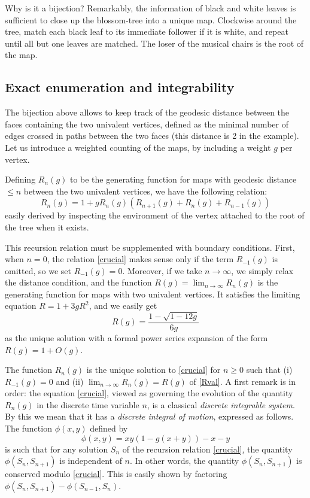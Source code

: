 \documentclass[12pt]{amsart}
\numberwithin{equation}{section}
\begin{document}
Why is it a bijection? Remarkably, the information of black and white leaves is sufficient to close up the blossom-tree 
into a unique map. Clockwise around the tree, match each black leaf to its immediate follower if it is white, and repeat until
all but one leaves are matched. The loser of the musical chairs is the root of the map.

\subsection{Exact enumeration and integrability}

The bijection above allows to keep track of the geodesic distance between the faces containing the two univalent vertices,
defined as the minimal number of edges crossed in paths between the two faces
(this distance is 2 in the example). Let us introduce a weighted counting of the maps, by including a weight $g$ per vertex.

Defining $R_n(g)$ to be the generating function for maps with geodesic distance $\leq n$ 
between the two univalent vertices, we have the following relation:
\begin{equation}\label{crucial}
R_n(g)= 1+ gR_n(g)\left( R_{n+1}(g)+R_n(g)+R_{n-1}(g)\right) 
\end{equation}
easily derived by inspecting the environment of the vertex attached to the root of the tree when it exists.

This recursion relation must be supplemented with boundary conditions. First, when $n=0$, the relation \eqref{crucial}
makes sense only if the term $R_{-1}(g)$ is omitted, so we set $R_{-1}(g)=0$. Moreover, if we take $n\to \infty$,
we simply relax the distance condition, and the function $R(g)=\lim_{n\to \infty} R_n(g)$ is the generating function
for maps with two univalent vertices. It satisfies the limiting equation $R=1+3 g R^2$, and we easily get 
\begin{equation}\label{Rval}R(g) =\frac{1-\sqrt{1-12g}}{6 g} \end{equation}
as the unique solution with a formal power series expansion of the form $R(g)=1+O(g)$.

The function $R_n(g)$ is the unique solution to \eqref{crucial} for $n\geq 0$ such that 
(i) $R_{-1}(g)=0$ and (ii) $\lim_{n\to \infty}R_n(g)=R(g)$ of \eqref{Rval}. A first remark is in order:
the equation \eqref{crucial}, viewed as governing the evolution of the quantity $R_n(g)$ in the
discrete time variable $n$,  is a classical {\it discrete integrable system}. By this we mean that it has a
{\it discrete integral of motion}, expressed as follows. The function $\phi(x,y)$ defined by
\begin{equation}\label{cons}\phi(x,y)= x y (1-g(x+y))-x-y \end{equation}
is such that for any solution $S_n$ of the recursion relation \eqref{crucial}, the quantity 
$\phi(S_n,S_{n+1})$ is independent of $n$. In other words, the quantity  $\phi(S_n,S_{n+1})$ is 
conserved modulo \eqref{crucial}. This is easily shown by factoring $\phi(S_n,S_{n+1})-\phi(S_{n-1},S_n)$.
\end{document}
